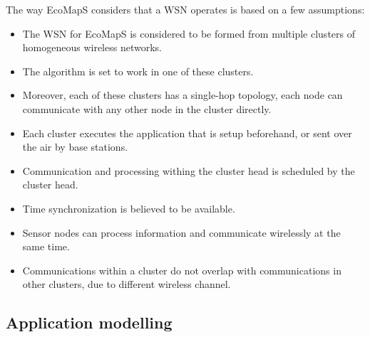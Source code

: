 The way EcoMapS considers that a WSN operates is based on a few assumptions:
\begin{itemize}
 \item The WSN for EcoMapS is considered to be formed from multiple clusters of homogeneous wireless networks.
 \item The algorithm is set to work in one of these clusters.
 \item Moreover, each of these clusters has a single-hop topology, each node can communicate with any other node in the cluster
directly.
 \item Each cluster executes the application that is setup beforehand, or sent over the air by base stations.
 \item Communication and processing withing the cluster head is scheduled by the cluster head.
 \item Time synchronization is believed to be available.
 \item Sensor nodes can process information and communicate wirelessly at the same time.
 \item Communications within a cluster do not overlap with communications in other clusters, due to different wireless channel.
\end{itemize}

\subsection{Application modelling}

